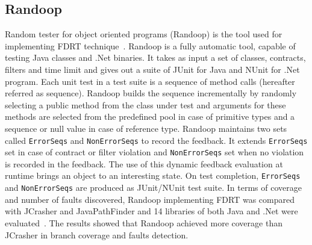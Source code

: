 

\subsection{Randoop}
Random tester for object oriented programs (Randoop) is the tool used for implementing FDRT technique~\cite{pacheco2007randoop}. Randoop is a fully automatic tool, capable of testing Java classes and .Net binaries. It takes as input a set of classes, contracts, filters and time limit and gives out a suite of JUnit for Java and NUnit for .Net program. Each unit test in a test suite is a sequence of method calls (hereafter referred as sequence). Randoop builds the sequence incrementally by randomly selecting a public method from the class under test and arguments for these methods are selected from the predefined pool in case of primitive types and a sequence or null value in case of reference type. Randoop maintains two sets called \verb+ErrorSeqs+ and \verb+NonErrorSeqs+ to record the feedback. It extends \verb+ErrorSeqs+ set in case of contract or filter violation and \verb+NonErrorSeqs+ set when no violation is recorded in the feedback. The use of this dynamic feedback evaluation at runtime brings an object to an interesting state. On test completion, \verb+ErrorSeqs+ and \verb+NonErrorSeqs+ are produced as JUnit/NUnit test suite. In terms of coverage and number of faults discovered, Randoop implementing FDRT was compared with JCrasher and JavaPathFinder and 14 libraries of both Java and .Net were evaluated~\cite{visser2004test}. The results showed that Randoop achieved more coverage than JCrasher in branch coverage and faults detection. 

